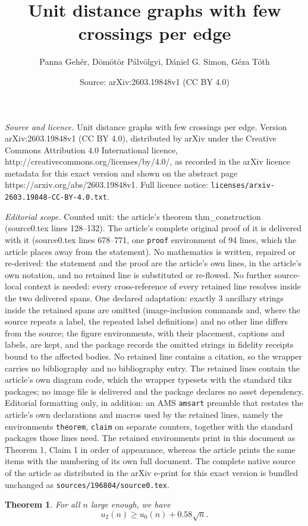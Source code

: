 \documentclass[10pt,a4paper]{amsart}
\title{Unit distance graphs with few crossings per edge}
\author{Panna Geh\'er, D\"om\"ot\"or P\'alv\"olgyi, D\'aniel G. Simon, G\'eza T\'oth}
\date{Source: arXiv:2603.19848v1 (CC BY 4.0)}
\newtheorem{theorem}{Theorem}
\begin{document}
\maketitle

\noindent\emph{Source and licence.} Unit distance graphs with few crossings per edge. Version arXiv:2603.19848v1 (CC BY 4.0), distributed by arXiv under the Creative Commons Attribution 4.0 International licence, http://creativecommons.org/licenses/by/4.0/, as recorded in the arXiv licence metadata for this exact version and shown on the abstract page https://arxiv.org/abs/2603.19848v1. Full licence notice: \texttt{licenses/arxiv-2603.19848-CC-BY-4.0.txt}.\par\smallskip

\noindent\textit{Editorial scope.} Counted unit: the article's theorem thm\_construction (source0.tex lines 128--132). The article's complete original proof of it is delivered with it (source0.tex lines 678--771, one \texttt{proof} environment of 94 lines, which the article places away from the statement). No mathematics is written, repaired or re-derived: the statement and the proof are the article's own lines, in the article's own notation, and no retained line is substituted or re-flowed.  No further source-local context is needed: every cross-reference of every retained line resolves inside the two delivered spans.  One declared adaptation: exactly 3 ancillary strings inside the retained spans are omitted (image-inclusion commands and, where the source repeats a label, the repeated label definitions) and no other line differs from the source; the figure environments, with their placement, captions and labels, are kept, and the package records the omitted strings in fidelity receipts bound to the affected bodies.  No retained line contains a citation, so the wrapper carries no bibliography and no bibliography entry.  The retained lines contain the article's own diagram code, which the wrapper typesets with the standard tikz packages; no image file is delivered and the package declares no asset dependency.  Editorial formatting only, in addition: an AMS \texttt{amsart} preamble that restates the article's own declarations and macros used by the retained lines, namely the environments \texttt{theorem}, \texttt{claim} on separate counters, together with the standard packages those lines need.  The retained environments print in this document as Theorem 1, Claim 1 in order of appearance, whereas the article prints the same items with the numbering of its own full document.  The complete native source of the article as distributed in the arXiv e-print for this exact version is bundled unchanged as \texttt{sources/196804/source0.tex}.
\begin{theorem} \label{thm_construction}
For all $n$ large enough, we have
    $$u_2(n) \geq u_0(n)+0.58\sqrt{n}.$$
    
\end{theorem}
\end{document}
